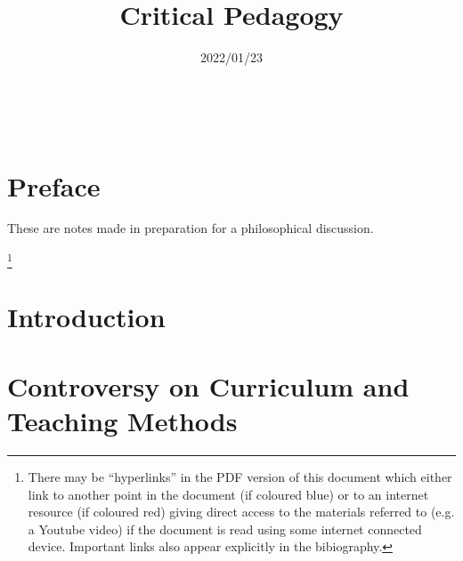 \documentclass[10pt,titlepage]{article}
\title{\LARGE\bf Critical Pedagogy}
\date{\small 2022/01/23}
\newcommand{\ignore}[1]{}
\begin{document}
                               
\begin{titlepage}
\maketitle





\end{titlepage}

\ \

\ignore{
\begin{centering}
{}
\end{centering}
}%

\setcounter{tocdepth}{2}
{\parskip-0pt\tableofcontents}


\pagebreak

\section*{Preface}

These are notes made in preparation for a philosophical discussion.




\footnote{There may be ``hyperlinks'' in the PDF version of this document which either link to another point in the document  (if coloured blue) or to an internet resource  (if coloured red) giving direct access to the materials referred to (e.g. a Youtube video) if the document is read using some internet connected device.
Important links also appear explicitly in the bibiography.}

\section{Introduction}


\section{Controversy on Curriculum and Teaching Methods}
\end{document}

